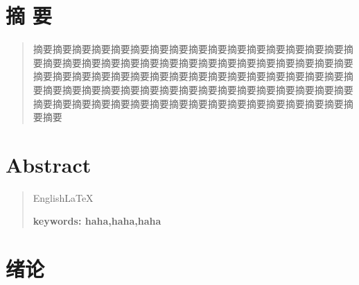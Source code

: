 \documentclass[a4paper,12pt,oneside,openany]{book}
\begin{document}
\clearpage
\thispagestyle{empty}

\frontmatter
	\chapter*{\centering 摘  要\\}
	
	\begin{quotation}
	摘要摘要摘要摘要摘要摘要摘要摘要摘要摘要摘要摘要摘要摘要摘要摘要摘要摘要摘要摘要摘要摘要摘要摘要摘要摘要摘要摘要摘要摘要摘要摘要摘要摘要摘要摘要摘要摘要摘要摘要摘要摘要摘要摘要摘要摘要摘要摘要摘要摘要摘要摘要摘要摘要摘要摘要摘要摘要摘要摘要摘要摘要摘要摘要摘要摘要摘要摘要摘要摘要摘要摘要摘要摘要摘要摘要摘要摘要摘要摘要摘要摘要摘要摘要

	\end{quotation}

	\chapter*{\centering Abstract\\}
	\begin{quotation}

	English\LaTeX

	\bf keywords: haha,haha,haha
	\end{quotation}

\clearpage

\tableofcontents
\newpage 
\mainmatter



\chapter[绪论]{绪论}
\end{document}
